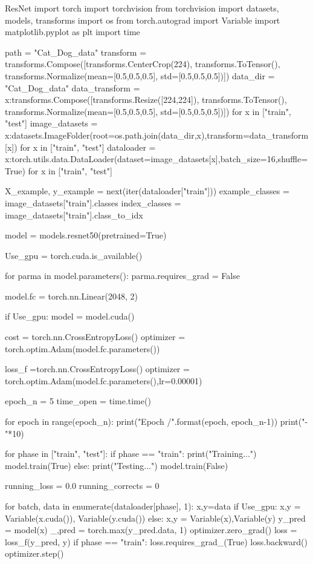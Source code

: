 \documentclass[openbib]{article}
\begin{document}
\begin{Python}{ResNet}
import torch
import torchvision
from torchvision import datasets, models, transforms
import os
from torch.autograd import Variable
import matplotlib.pyplot as plt
import time

path = "Cat_Dog_data"
transform = transforms.Compose([transforms.CenterCrop(224),
transforms.ToTensor(),
transforms.Normalize(mean=[0.5,0.5,0.5], std=[0.5,0.5,0.5])])
data_dir = "Cat_Dog_data"
data_transform = {x:transforms.Compose([transforms.Resize([224,224]),
					transforms.ToTensor(),
					transforms.Normalize(mean=[0.5,0.5,0.5], std=[0.5,0.5,0.5])])
				for x in ["train", "test"]}
image_datasets = {x:datasets.ImageFolder(root=os.path.join(data_dir,x),transform=data_transform[x])
				for x in ["train", "test"]}
dataloader = {x:torch.utils.data.DataLoader(dataset=image_datasets[x],batch_size=16,shuffle=True)
			  for x in ["train", "test"]}

X_example, y_example = next(iter(dataloader["train"]))
example_classes = image_datasets["train"].classes
index_classes = image_datasets["train"].class_to_idx

model = models.resnet50(pretrained=True)

Use_gpu = torch.cuda.is_available()

for parma in model.parameters():
	parma.requires_grad = False

model.fc = torch.nn.Linear(2048, 2)

if Use_gpu:
	model = model.cuda()

cost = torch.nn.CrossEntropyLoss()
optimizer = torch.optim.Adam(model.fc.parameters())

loss_f =torch.nn.CrossEntropyLoss()
optimizer = torch.optim.Adam(model.fc.parameters(),lr=0.00001)

epoch_n = 5
time_open = time.time()

for epoch in range(epoch_n):
	print("Epoch {}/{}".format(epoch, epoch_n-1))
	print("-"*10)

	for phase in ["train", "test"]:
	if phase == "train":
		print("Training...")
		model.train(True)
	else:
		print("Testing...")
		model.train(False)

	running_loss = 0.0
	running_corrects = 0
	
	for batch, data in enumerate(dataloader[phase], 1):
		x,y=data
		if Use_gpu:
			x,y = Variable(x.cuda()), Variable(y.cuda())
		else:
			x,y = Variable(x),Variable(y)
		y_pred = model(x)
		_,pred = torch.max(y_pred.data, 1)
		optimizer.zero_grad()
		loss = loss_f(y_pred, y)
		if phase == "train":
			loss.requires_grad_(True)
			loss.backward()
			optimizer.step()
	

\end{Python}
\end{document}
